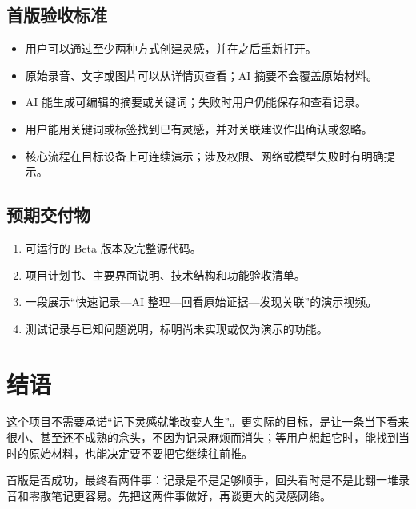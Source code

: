 \documentclass[UTF8,a4paper,12pt]{ctexart}
\begin{document}
\subsection{首版验收标准}
\begin{itemize}
  \item 用户可以通过至少两种方式创建灵感，并在之后重新打开。
  \item 原始录音、文字或图片可以从详情页查看；AI 摘要不会覆盖原始材料。
  \item AI 能生成可编辑的摘要或关键词；失败时用户仍能保存和查看记录。
  \item 用户能用关键词或标签找到已有灵感，并对关联建议作出确认或忽略。
  \item 核心流程在目标设备上可连续演示；涉及权限、网络或模型失败时有明确提示。
\end{itemize}

\subsection{预期交付物}
\begin{enumerate}
  \item 可运行的 Beta 版本及完整源代码。
  \item 项目计划书、主要界面说明、技术结构和功能验收清单。
  \item 一段展示“快速记录—AI 整理—回看原始证据—发现关联”的演示视频。
  \item 测试记录与已知问题说明，标明尚未实现或仅为演示的功能。
\end{enumerate}

\section{结语}
这个项目不需要承诺“记下灵感就能改变人生”。更实际的目标，是让一条当下看来很小、甚至还不成熟的念头，不因为记录麻烦而消失；等用户想起它时，能找到当时的原始材料，也能决定要不要把它继续往前推。

首版是否成功，最终看两件事：记录是不是足够顺手，回头看时是不是比翻一堆录音和零散笔记更容易。先把这两件事做好，再谈更大的灵感网络。
\end{document}
